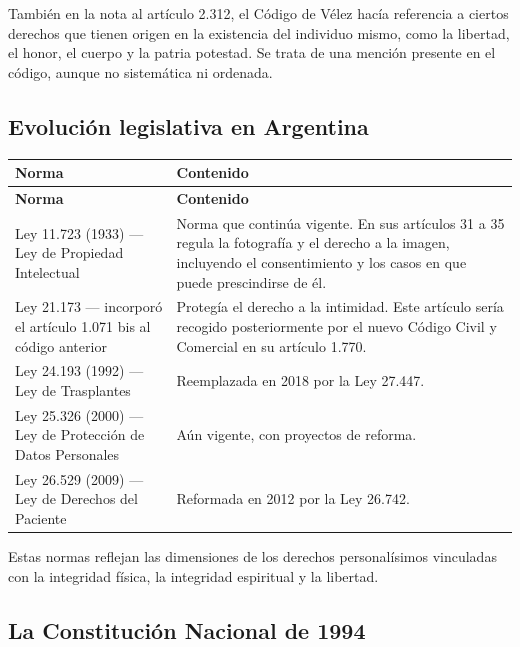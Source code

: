 \documentclass[12pt,oneside]{book}
\begin{document}
También en la nota al artículo 2.312, el Código de Vélez hacía referencia a ciertos derechos que tienen origen en la existencia del individuo mismo, como la libertad, el honor, el cuerpo y la patria potestad. Se trata de una mención presente en el código, aunque no sistemática ni ordenada.

\subsection{Evolución legislativa en Argentina}

\begin{longtable}{p{} p{}}
\toprule
\textbf{Norma} & \textbf{Contenido} \\
\midrule
\endfirsthead
\toprule
\textbf{Norma} & \textbf{Contenido} \\
\midrule
\endhead
Ley 11.723 (1933) — Ley de Propiedad Intelectual & Norma que continúa vigente. En sus artículos 31 a 35 regula la fotografía y el derecho a la imagen, incluyendo el consentimiento y los casos en que puede prescindirse de él. \\
\addlinespace
Ley 21.173 — incorporó el artículo 1.071 bis al código anterior & Protegía el derecho a la intimidad. Este artículo sería recogido posteriormente por el nuevo Código Civil y Comercial en su artículo 1.770. \\
\addlinespace
Ley 24.193 (1992) — Ley de Trasplantes & Reemplazada en 2018 por la Ley 27.447. \\
\addlinespace
Ley 25.326 (2000) — Ley de Protección de Datos Personales & Aún vigente, con proyectos de reforma. \\
\addlinespace
Ley 26.529 (2009) — Ley de Derechos del Paciente & Reformada en 2012 por la Ley 26.742. \\
\bottomrule
\end{longtable}

Estas normas reflejan las dimensiones de los derechos personalísimos vinculadas con la integridad física, la integridad espiritual y la libertad.

\subsection{La Constitución Nacional de 1994}
\end{document}

